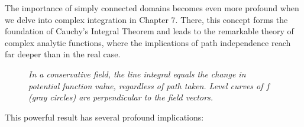 \noindent The importance of simply connected domains becomes even more profound when we delve into complex integration in Chapter 7. There, this concept forms the foundation of Cauchy's Integral Theorem and leads to the remarkable theory of complex analytic functions, where the implications of path independence reach far deeper than in the real case.

\begin{figure}[H]
    \centering
    \caption{\textit{In a conservative field, the line integral equals the change in potential function value, regardless of path taken. Level curves of $f$ (gray circles) are perpendicular to the field vectors.}}
    \label{fig:potential_function}
    \end{figure}

\noindent This powerful result has several profound implications:

